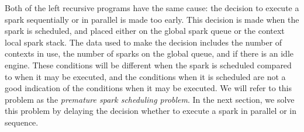 Both of the left recursive programs have the same cause:
the decision to execute a spark sequentially or in parallel is
made too early.
This decision is made when the spark is scheduled,
and placed either on the global spark queue or the context local spark
stack.
The data used to make the decision includes the number of contexts in
use,
the number of sparks on the global queue,
and if there is an idle engine.
These conditions will be different when the spark is scheduled compared
to when it may be executed,
and the conditions when it is scheduled are not a good indication of
the conditions when it may be executed.
We will refer to this problem as the \emph{premature spark scheduling problem}.
In the next section,
we solve this problem by delaying the decision whether to execute a spark in
parallel or in sequence.


